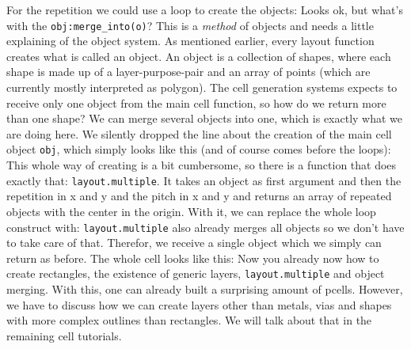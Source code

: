 For the repetition we could use a loop to create the objects:
Looks ok, but what's with the \lstinline!obj:merge_into(o)!? This is a \emph{method} of objects and needs a little explaining of the object system. As mentioned
earlier, every layout function creates what is called an object. An object is a collection of shapes, where each shape is made up of a layer-purpose-pair and an
array of points (which are currently mostly interpreted as polygon). The cell generation systems expects to receive only one object from the main cell function, so
how do we return more than one shape? We can merge several objects into one, which is exactly what we are doing here. We silently dropped the line about the creation
of the main cell object \lstinline!obj!, which simply looks like this (and of course comes before the loops):
This whole way of creating is a bit cumbersome, so there is a function that does exactly that: \lstinline!layout.multiple!. It takes an object as first argument and
then the repetition in x and y and the pitch in x and y and returns an array of repeated objects with the center in the origin. With it, we can replace the whole
loop construct with:
\lstinline!layout.multiple! also already merges all objects so we don't have to take care of that. Therefor, we receive a single object which we simply can return as
before. The whole cell looks like this:
Now you already now how to create rectangles, the existence of generic layers, \lstinline!layout.multiple! and object merging. With this, one can already built a
surprising amount of pcells. However, we have to discuss how we can create layers other than metals, vias and shapes with more complex outlines than rectangles. We
will talk about that in the remaining cell tutorials.


